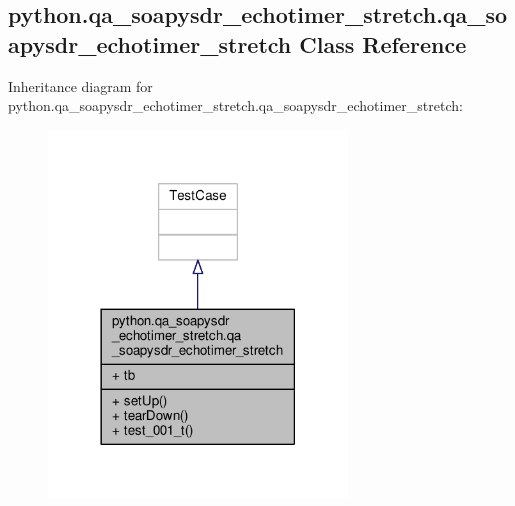 \subsection{python.\+qa\+\_\+soapysdr\+\_\+echotimer\+\_\+stretch.\+qa\+\_\+soapysdr\+\_\+echotimer\+\_\+stretch Class Reference}
\label{classpython_1_1qa__soapysdr__echotimer__stretch_1_1qa__soapysdr__echotimer__stretch}


Inheritance diagram for python.\+qa\+\_\+soapysdr\+\_\+echotimer\+\_\+stretch.\+qa\+\_\+soapysdr\+\_\+echotimer\+\_\+stretch\+:
\nopagebreak
\begin{figure}[H]
\begin{center}
\leavevmode
\includegraphics[width=225pt]{d4/d5b/classpython_1_1qa__soapysdr__echotimer__stretch_1_1qa__soapysdr__echotimer__stretch__inherit__graph}
\end{center}
\end{figure}


